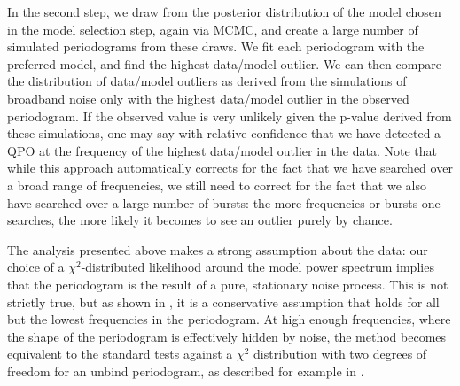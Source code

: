\documentclass[numberedappendix]{emulateapj}
\begin{document}
In the second step, we draw from the posterior distribution of the model chosen in the model selection step, again via MCMC, and create a large number of simulated periodograms from these draws. We fit each periodogram with the preferred model, and find the highest data/model outlier. We can then compare the distribution of data/model outliers as derived from the simulations of broadband noise only with the highest data/model outlier in the observed periodogram. If the observed value is very unlikely given the p-value derived from these simulations, one may say with relative confidence that we have detected a QPO at the frequency of the highest data/model outlier in the data. Note that while this approach automatically corrects for the fact that we have searched over a broad range of frequencies, we still need to correct for the fact that we also have searched over a large number of bursts: the more frequencies or bursts one searches, the more likely it becomes to see an outlier purely by chance. 

The analysis presented above makes a strong assumption about the data: our choice of a $\chi^2$-distributed likelihood around the model power spectrum implies that the periodogram is the result of a pure, stationary noise process. This is not strictly true, but as shown in \citet{huppenkothen2013}, it is a conservative assumption that holds for all but the lowest frequencies in the periodogram. At high enough frequencies, where the shape of the periodogram is effectively hidden by noise, the method becomes equivalent to the standard tests against a $\chi^2$ distribution with two degrees of freedom for an unbind periodogram, as described for example in \citet{vanderklis1989}.
\end{document}
